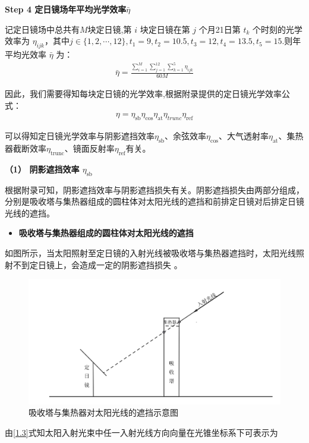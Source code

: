 \documentclass[../main.tex]{subfiles}
\begin{document}
\noindent \textbf{Step 4 定日镜场年平均光学效率\(\bar{\eta}\)}
\par 记定日镜场中总共有$M$块定日镜,第 \(i\) 块定日镜在第 \(j\) 个月21日第 \(t_k\) 个时刻的光学效率为 \(\eta_{ijk}\)，其中$j\in \{1,2,\cdots,12\},t_1=9,t_2=10.5,t_3=12,t_4=13.5,t_5=15$.则年平均光效率 \(\bar{\eta}\) 为：
\begin{align}\label{1.50}
\bar{\eta}=\frac{\sum\limits_{i=1}^M{\sum\limits_{j=1}^{12}{\sum\limits_{k=1}^5{\eta _{ijk}}}}}{60M}
\end{align}
\par 因此，我们需要得知每块定日镜的光学效率,根据附录提供的定日镜光学效率公式：
\begin{align}\label{1.18}
\eta =\eta _{\text{sb}}\eta _{\cos}\eta _{\text{at}}\eta _{trunc}\eta _{\text{ref}}
  \end{align}
\par 可以得知定日镜光学效率与阴影遮挡效率$\eta_{\text{sb}}$、余弦效率$\eta_{\text{cos}}$、大气透射率$\eta_{\text{at}}$、集热器截断效率$\eta_{\text{trunc}}$、镜面反射率$\eta_{\text{ref}}$有关。
\par \textbf{（1） 阴影遮挡效率 $\eta_{\text{sb}}$}
\par 根据附录可知，阴影遮挡效率与阴影遮挡损失有关。阴影遮挡损失由两部分组成，分别是吸收塔与集热器组成的圆柱体对太阳光线的遮挡和前排定日镜对后排定日镜光线的遮挡。
\begin{itemize}
  \item \textbf{吸收塔与集热器组成的圆柱体对太阳光线的遮挡}
\end{itemize}
\par 如图所示，当太阳照射至定日镜的入射光线被吸收塔与集热器遮挡时，太阳光线照射不到定日镜上，会造成一定的阴影遮挡损失 。
 \begin{figure}[H]
\centering
\includegraphics[width=.9\textwidth]{6}
\caption{吸收塔与集热器对太阳光线的遮挡示意图}
\label{1.19}
\end{figure}
\par 由\eqref{1.3}式知太阳入射光束中任一入射光线方向向量在光锥坐标系下可表示为
\end{document}
